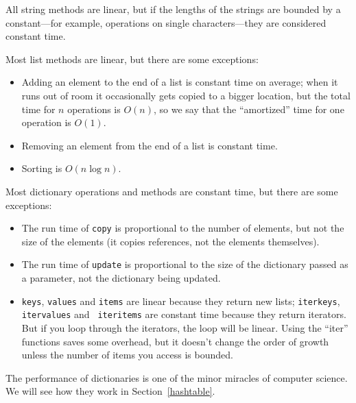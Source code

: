 \documentclass[10pt]{book}
\begin{document}
All string methods are linear, but if the lengths of
the strings are bounded by a constant---for example, operations on single
characters---they are considered constant time.

Most list methods are linear, but there are some exceptions:

\begin{itemize}

\item Adding an element to the end of a list is constant time on
average; when it runs out of room it occasionally gets copied
to a bigger location, but the total time for $n$ operations
is $O(n)$, so we say that the ``amortized'' time for one
operation is $O(1)$.

\item Removing an element from the end of a list is constant time.

\item Sorting is $O(n \log n)$.

\end{itemize}

Most dictionary operations and methods are constant time, but
there are some exceptions:

\begin{itemize}

\item The run time of {\tt copy} is proportional to the number of
  elements, but not the size of the elements (it copies references,
  not the elements themselves).

\item The run time of {\tt update} is
  proportional to the size of the dictionary passed as a parameter,
  not the dictionary being updated.

\item {\tt keys}, {\tt values} and {\tt items} are linear because they
  return new lists; {\tt iterkeys}, {\tt itervalues} and {\tt
    iteritems} are constant time because they return iterators.  But
  if you loop through the iterators, the loop will be linear.  Using
  the ``iter'' functions saves some overhead, but it doesn't change
  the order of growth unless the number of items you access is
  bounded.

\end{itemize}

The performance of dictionaries is one of the minor miracles of
computer science.  We will see how they work in
Section~\ref{hashtable}.
\end{document}
